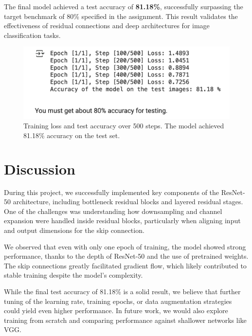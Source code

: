 The final model achieved a test accuracy of \textbf{81.18\%}, successfully surpassing the target benchmark of 80\% specified in the assignment. This result validates the effectiveness of residual connections and deep architectures for image classification tasks.

\begin{figure}[h]
\centering
\includegraphics[width=0.9\linewidth]{CNN_result.png}
\caption{Training loss and test accuracy over 500 steps. The model achieved 81.18\% accuracy on the test set.}
\end{figure}


\section{Discussion}
\label{sec:discussion}

During this project, we successfully implemented key components of the ResNet-50 architecture, including bottleneck residual blocks and layered residual stages. One of the challenges was understanding how downsampling and channel expansion were handled inside residual blocks, particularly when aligning input and output dimensions for the skip connection.

We observed that even with only one epoch of training, the model showed strong performance, thanks to the depth of ResNet-50 and the use of pretrained weights. The skip connections greatly facilitated gradient flow, which likely contributed to stable training despite the model's complexity.

While the final test accuracy of 81.18\% is a solid result, we believe that further tuning of the learning rate, training epochs, or data augmentation strategies could yield even higher performance. In future work, we would also explore training from scratch and comparing performance against shallower networks like VGG.
